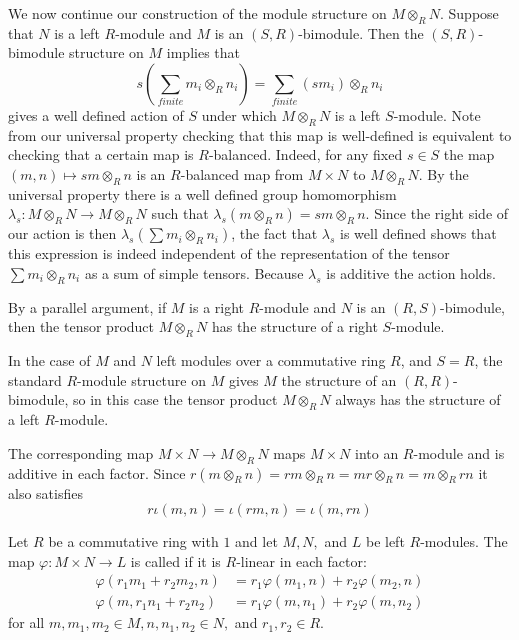 \documentclass[12pt, a4paper, oneside, openright, titlepage]{book}
\begin{document}
\begin{cons}
    We now continue our construction of the module structure on $M\otimes_RN$. Suppose that $N$ is a left $R$-module and $M$ is an $(S,R)$-bimodule. Then the $(S,R)$-bimodule structure on $M$ implies that \begin{equation*}
        s\left(\sum\limits_{finite}m_i\otimes_Rn_i\right) = \sum\limits_{finite}(sm_i)\otimes_Rn_i
    \end{equation*}
    gives a well defined action of $S$ under which $M\otimes_RN$ is a left $S$-module. Note from our universal property checking that this map is well-defined is equivalent to checking that a certain map is $R$-balanced. Indeed, for any fixed $s \in S$ the map $(m,n)\mapsto sm\otimes_R n$ is an $R$-balanced map from $M \times N$ to $M\otimes_RN$. By the universal property there is a well defined group homomorphism $\lambda_s:M\otimes_RN\rightarrow M\otimes_RN$ such that $\lambda_s(m\otimes_Rn) = sm\otimes_Rn$. Since the right side of our action is then $\lambda_s\left(\sum m_i\otimes_Rn_i\right)$, the fact that $\lambda_s$ is well defined shows that this expression is indeed independent of the representation of the tensor $\sum m_i\otimes_R n_i$ as a sum of simple tensors. Because $\lambda_s$ is additive the action holds. 

    By a parallel argument, if $M$ is a right $R$-module and $N$ is an $(R,S)$-bimodule, then the tensor product $M\otimes_RN$ has the structure of a right $S$-module.
\end{cons}


In the case of $M$ and $N$ left modules over a commutative ring $R$, and $S = R$, the standard $R$-module structure on $M$ gives $M$ the structure of an $(R,R)$-bimodule, so in this case the tensor product $M\otimes_RN$ always has the structure of a left $R$-module.

The corresponding map $M\times N\rightarrow M\otimes_RN$ maps $M\times N$ into an $R$-module and is additive in each factor. Since $r(m\otimes_Rn) = rm\otimes_Rn = mr\otimes_Rn = m\otimes_Rrn$ it also satisfies \begin{equation*}
    r\iota(m,n) = \iota(rm,n) = \iota(m,rn)
\end{equation*}

\begin{defn}
    Let $R$ be a commutative ring with $1$ and let $M,N,$ and $L$ be left $R$-modules. The map $\varphi:M\times N\rightarrow L$ is called  if it is $R$-linear in each factor: \begin{align*}
        \varphi(r_1m_1+r_2m_2,n) &= r_1\varphi(m_1,n)+r_2\varphi(m_2,n) \\
        \varphi(m,r_1n_1+r_2n_2) &= r_1\varphi(m,n_1)+r_2\varphi(m,n_2)
    \end{align*}
    for all $m,m_1,m_2 \in M,n,n_1,n_2 \in N,$ and $r_1,r_2 \in R$.
\end{defn}
\end{document}
